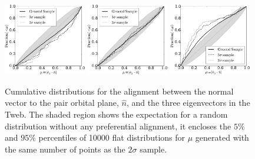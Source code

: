 \documentclass{emulateapj}
\begin{document}
\begin{figure}
\begin{center}
  \includegraphics[width=0.32\textwidth]{fig3a.pdf}
  \includegraphics[width=0.32\textwidth]{fig3b.pdf}
  \includegraphics[width=0.32\textwidth]{fig3c.pdf}
\end{center}
\caption{Cumulative distributions for the alignment between the normal
  vector to the pair orbital plane, $\hat{n}$, and the three eigenvectors in
  the Tweb. 
The shaded region shows the expectation for a random
  distribution without any preferential alignment, it encloses the $5\%$ and $95\%$ percentiles of 10000
  flat distributions for $\mu$ generated with the  same number of
  points as the $2\sigma$ sample.  
    \label{fig:alignment_n}}  
\end{figure}
\end{document}
